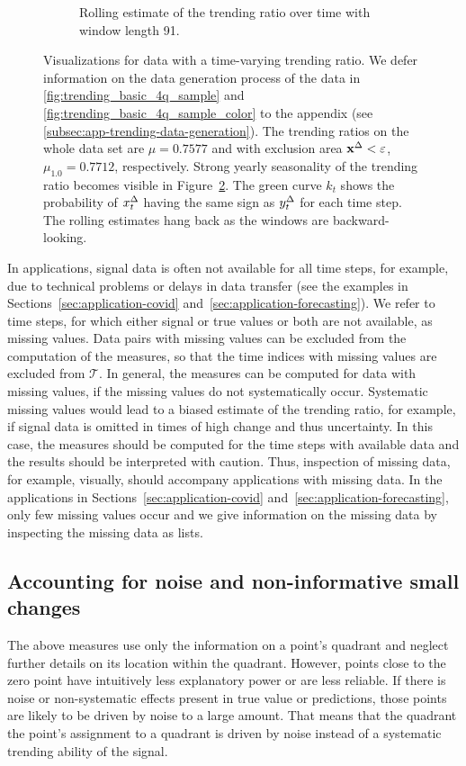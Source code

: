 \begin{figure}
\begin{subfigure}[t]{.48\textwidth}
    \caption{Rolling estimate of the trending ratio over time with window length 91. }\label{fig:trending_ratio_time_series}
    \end{subfigure}%
    \caption{Visualizations for data with a time-varying trending ratio. We defer information on the data generation process of the data in \ref{fig:trending_basic_4q_sample} and \ref{fig:trending_basic_4q_sample_color} to the appendix (see \ref{subsec:app-trending-data-generation}). The trending ratios on the whole data set are $\mu = 0.7577$ and with exclusion area $\mathbf{x}^{\Delta} < \varepsilon$, $\mu_{1.0} = 0.7712$, respectively. Strong yearly seasonality of the trending ratio becomes visible in Figure~\ref{fig:trending_ratio_time_series}. The green curve $k_t$ shows the probability of $x^{\Delta}_{t}$ having the same sign as $y^{\Delta}_{t}$ for each time step. The rolling estimates hang back as the windows are backward-looking.}
\end{figure}


In applications, signal data is often not available for all time steps, for example, due to technical problems or delays in data transfer (see the examples in Sections~\ref{sec:application-covid} and~\ref{sec:application-forecasting}).
We refer to time steps, for which either signal or true values or both are not available, as missing values.
Data pairs with missing values can be excluded from the computation of the measures, so that the time indices with missing values are excluded from $\mathcal{T}$.
In general, the measures can be computed for data with missing values, if the missing values do not systematically occur.
Systematic missing values would lead to a biased estimate of the trending ratio, for example, if signal data is omitted in times of high change and thus uncertainty.
In this case, the measures should be computed for the time steps with available data and the results should be interpreted with caution.
Thus, inspection of missing data, for example, visually, should accompany applications with missing data.
In the applications in Sections~\ref{sec:application-covid} and~\ref{sec:application-forecasting}, only few missing values occur and we give information on the missing data by inspecting the missing data as lists.

\subsection{Accounting for noise and non-informative small changes}\label{subsec:trending-noise}

The above measures use only the information on a point's quadrant and neglect further details on its location within the quadrant.
However, points close to the zero point have intuitively less explanatory power or are less reliable.
If there is noise or non-systematic effects present in true value or predictions, those points are likely to be driven by noise to a large amount.
That means that the quadrant the point's assignment to a quadrant is driven by noise instead of a systematic trending ability of the signal.

